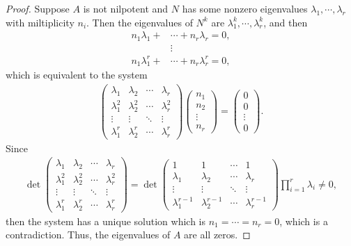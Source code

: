 \documentclass[10pt]{book}
\theoremstyle{definition}
\numberwithin{equation}{chapter}
\begin{document}
\begin{subappendices}
\begin{proof}
Suppose $A$ is not nilpotent and $N$ has some nonzero eigenvalues $\lambda_1, \cdots, \lambda_r$ with miltiplicity $n_i$. Then the eigenvalues of $N^k$ are $\lambda_1^k, \cdots, \lambda_r^k$, and then
\begin{align*}
    n_1 \lambda_1 + & \cdots + n_r \lambda_r = 0, \\
    & \vdots \\
    n_1 \lambda_1^r + & \cdots + n_r \lambda_r^r = 0,
\end{align*}
which is equivalent to the system
\begin{align*}
    \begin{pmatrix}
        \lambda_1 & \lambda_2 & \cdots & \lambda_r \\
        \lambda_1^2 & \lambda_2^2 & \cdots & \lambda_r^2 \\
        \vdots & \vdots & \ddots & \vdots \\
        \lambda_1^r & \lambda_2^r & \cdots & \lambda_r^r
    \end{pmatrix} 
    \begin{pmatrix}
        n_1 \\
        n_2 \\
        \vdots \\
        n_r
    \end{pmatrix} = \begin{pmatrix}
        0 \\
        0 \\
        \vdots \\
        0
    \end{pmatrix}.
\end{align*}
Since 
\begin{align*}
    \det \begin{pmatrix}
        \lambda_1 & \lambda_2 & \cdots & \lambda_r \\
        \lambda_1^2 & \lambda_2^2 & \cdots & \lambda_r^2 \\
        \vdots & \vdots & \ddots & \vdots \\
        \lambda_1^r & \lambda_2^r & \cdots & \lambda_r^r
    \end{pmatrix} = \det \begin{pmatrix}
        1 & 1 & \cdots & 1 \\
        \lambda_1 & \lambda_2 & \cdots & \lambda_r \\
        \vdots & \vdots & \ddots & \vdots \\
        \lambda_1^{r-1} & \lambda_2^{r-1} & \cdots & \lambda_r^{r-1}
    \end{pmatrix} \prod^r_{i=1} \lambda_i \neq 0,
\end{align*}
then the system has a unique solution which is $n_1 = \cdots = n_r = 0$, which is a contradiction\cite{31}. Thus, the eigenvalues of $A$ are all zeros.
\end{proof}


\end{subappendices}
\end{document}
